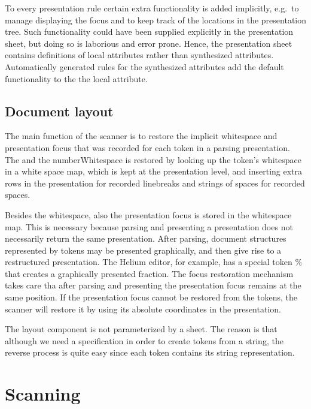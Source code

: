 \documentclass[12pt]{article}
\begin{document}
To every presentation rule certain extra functionality is added implicitly, e.g.\ to manage displaying the focus and to keep track of the locations in the presentation tree. Such functionality could have been supplied explicitly in the presentation sheet, but doing so is laborious and error prone. Hence, the presentation sheet contains definitions of local attributes  rather than synthesized attributes. Automatically generated rules for the synthesized  attributes add the default functionality to the the local attribute.


\subsection{Document layout}

The main function of the scanner is to restore the implicit whitespace and presentation focus that was recorded for each token in a parsing presentation. The  and the numberWhitespace is restored by looking up the token's whitespace in a white space map, which is kept at the presentation level, and inserting extra rows in the presentation for recorded linebreaks and strings of spaces for recorded spaces. 

Besides the whitespace, also the presentation focus is stored in the whitespace map. This is necessary because parsing and presenting a presentation does not necessarily return the same presentation. After parsing, document structures represented by tokens may be presented graphically, and then give rise to a restructured presentation. The Helium editor, for example, has a special token $\%$ that creates a graphically presented fraction. The focus restoration mechanism takes care tha after parsing and presenting the presentation focus remains at the same position. If the presentation focus cannot be restored from the tokens, the scanner will restore it by using its absolute coordinates in the presentation. 

The layout component is not parameterized by a sheet. The reason is that although we need a specification in order to create tokens from a string, the reverse process is quite easy since each token contains its string representation.  





%
\section{Scanning}\label{sect:scanner}
%
\end{document}
